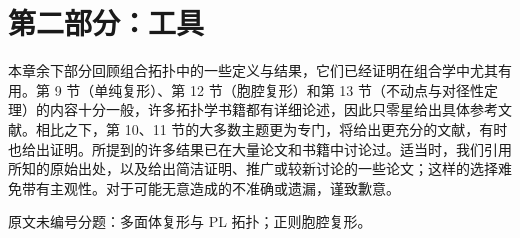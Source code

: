 \section*{第二部分：工具}
本章余下部分回顾组合拓扑中的一些定义与结果，它们已经证明在组合学中尤其有用。第 9 节（单纯复形）、第 12 节（胞腔复形）和第 13 节（不动点与对径性定理）的内容十分一般，许多拓扑学书籍都有详细论述，因此只零星给出具体参考文献。相比之下，第 10、11 节的大多数主题更为专门，将给出更充分的文献，有时也给出证明。所提到的许多结果已在大量论文和书籍中讨论过。适当时，我们引用所知的原始出处，以及给出简洁证明、推广或较新讨论的一些论文；这样的选择难免带有主观性。对于可能无意造成的不准确或遗漏，谨致歉意。
\setcounter{section}{8}

\setcounter{section}{10}

\noindent 原文未编号分题：多面体复形与 PL 拓扑；正则胞腔复形。\par
{}
\blankrefs

